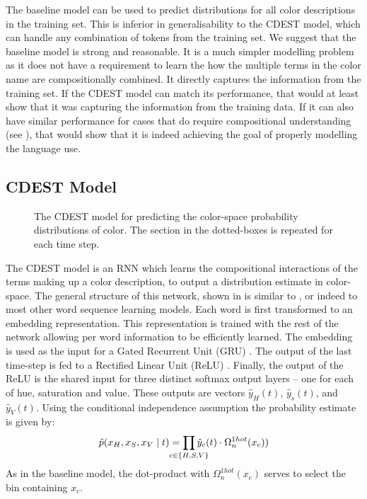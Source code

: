 \documentclass[11pt,a4paper]{article}
\newcommand{\parencite}{\citep}
\newcommand{\textcite}{\citet}
\begin{document}
The baseline model can be used to predict distributions for all color descriptions in the training set.
This is inferior in generalisability to the CDEST model, which can handle any combination of tokens from the training set.
We suggest that the baseline model is strong and reasonable.
It is a much simpler modelling problem as it does not have a requirement to learn the how the multiple terms in the color name are compositionally combined.
It directly captures the information from the training set.
If the CDEST model can match its performance, that would at least show that it was capturing the information from the training data.
If it can also have similar performance for cases that do require compositional understanding (see ), that would show that it is indeed achieving the goal of properly modelling the language use.

\subsection{CDEST Model}

\begin{figure}
	\resizebox{\columnwidth}{!}{}
	
	\caption{\label{network}
		The CDEST model for predicting the color-space probability distributions of color.
		The section in the dotted-boxes is repeated for each time step.
	}
\end{figure}

The CDEST model is an RNN which learns the compositional interactions of the terms making up a color description, to output a distribution estimate in color-space.
The general structure of this network, shown in  is similar to \textcite{2016arXiv160603821M}, or indeed to most other word sequence learning models.
Each word is first transformed to an embedding representation.
This representation is trained with the rest of the network allowing per word information to be efficiently learned.
The embedding is used as the input for a Gated Recurrent Unit (GRU)  \parencite{cho2014properties}.
The output of the last time-step is fed to a Rectified Linear Unit (ReLU)  \parencite{dahl2013reludropout}.
Finally, the output of the ReLU is the shared input for three distinct softmax output layers -- one for each of hue, saturation and value.
These outputs are vectors $\hat{y}_{H}(t)$, $\hat{y}_{s}(t)$, and $\hat{y}_{V}(t)$.
Using the conditional independence assumption the probability estimate is given by:
\[
	\hat{p}(x_H,x_S,x_V\mid t) = \displaystyle\prod_{
		\mathclap{c\in {\{H,S,V\}}}}
	 \hat{y}_{c}(t)\cdot \Omega_{n}^{1hot}(x_c))
\]
As in the baseline model, the dot-product with $\Omega_{n}^{1hot}(x_c)$ serves to select the bin containing $x_c$.
\end{document}
